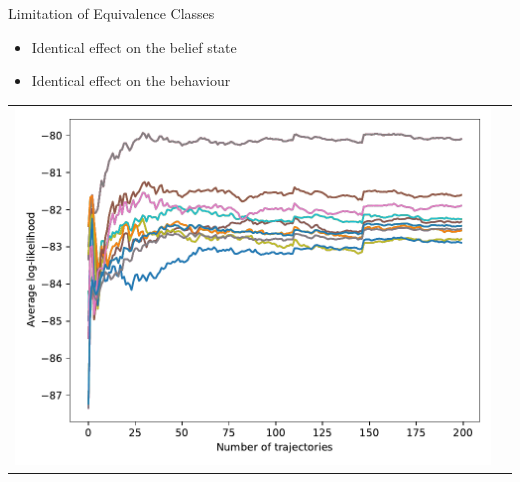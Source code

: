 \documentclass[
english,%
aspectratio=169,%
color={accentcolor=3b},
logo=true,%
colorframetitle=false,%
]{tudabeamer}
\begin{document}
\begin{frame}{Limitation of Equivalence Classes}
\vspace{-5pt}
\begin{itemize}
\item Identical effect on the belief state
\item Identical effect on the behaviour
\end{itemize}
\vspace{+2pt}
\centering
\begin{tabular}{cc}
\includegraphics[height=0.6\textheight]{figures/llh_exactUpdate_81model}

\end{tabular}
\end{frame}
\end{document}
